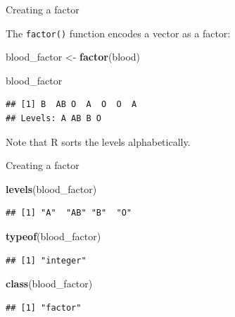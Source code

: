 \documentclass[ignorenonframetext,]{beamer}
\newenvironment{Shaded}{\begin{snugshade}}{\end{snugshade}}
\newcommand{\KeywordTok}[1]{\textcolor[rgb]{0.13,0.29,0.53}{\textbf{#1}}}
\newcommand{\NormalTok}[1]{#1}
\newcommand{\StringTok}[1]{\textcolor[rgb]{0.31,0.60,0.02}{#1}}
\begin{document}
\begin{frame}[fragile]{Creating a factor}
\protect\hypertarget{creating-a-factor-1}{}

The \texttt{factor()} function encodes a vector as a factor:

\begin{Shaded}
\begin{Highlighting}[]
\NormalTok{blood_factor <-}\StringTok{ }\KeywordTok{factor}\NormalTok{(blood) }

\NormalTok{blood_factor}
\end{Highlighting}
\end{Shaded}

\begin{verbatim}
## [1] B  AB O  A  O  O  A 
## Levels: A AB B O
\end{verbatim}

Note that R sorts the levels alphabetically.

\end{frame}

\begin{frame}[fragile]{Creating a factor}
\protect\hypertarget{creating-a-factor-2}{}

\begin{Shaded}
\begin{Highlighting}[]
\KeywordTok{levels}\NormalTok{(blood_factor)}
\end{Highlighting}
\end{Shaded}

\begin{verbatim}
## [1] "A"  "AB" "B"  "O"
\end{verbatim}

\begin{Shaded}
\begin{Highlighting}[]
\KeywordTok{typeof}\NormalTok{(blood_factor)}
\end{Highlighting}
\end{Shaded}

\begin{verbatim}
## [1] "integer"
\end{verbatim}

\begin{Shaded}
\begin{Highlighting}[]
\KeywordTok{class}\NormalTok{(blood_factor)}
\end{Highlighting}
\end{Shaded}

\begin{verbatim}
## [1] "factor"
\end{verbatim}

\end{frame}
\end{document}
